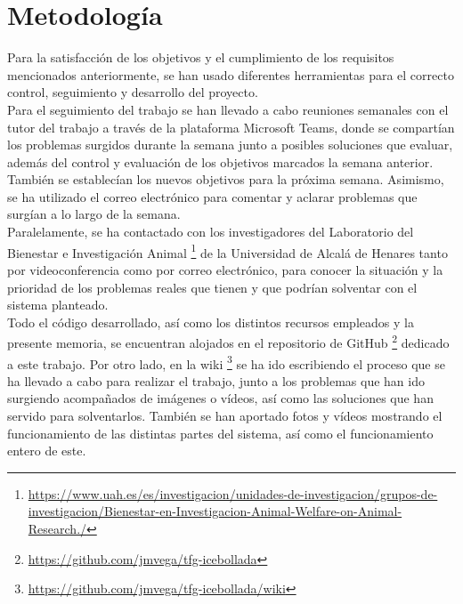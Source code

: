 \section{Metodología}
\label{sec:metodologia}
Para la satisfacción de los objetivos y el cumplimiento de los requisitos mencionados anteriormente, se han usado diferentes herramientas para el correcto control, seguimiento y desarrollo del proyecto.\\

Para el seguimiento del trabajo se han llevado a cabo reuniones semanales con el tutor del trabajo a través de la plataforma Microsoft Teams, donde se compartían los problemas surgidos durante la semana junto a posibles soluciones que evaluar, además del control y evaluación de los objetivos marcados la semana anterior. También se establecían los nuevos objetivos para la próxima semana. Asimismo, se ha utilizado el correo electrónico para comentar y aclarar problemas que surgían a lo largo de la semana.\\

Paralelamente, se ha contactado con los investigadores del Laboratorio del Bienestar e Investigación Animal \footnote{\url{https://www.uah.es/es/investigacion/unidades-de-investigacion/grupos-de-investigacion/Bienestar-en-Investigacion-Animal-Welfare-on-Animal-Research./}} de la Universidad de Alcalá de Henares tanto por videoconferencia como por correo electrónico, para conocer la situación y la prioridad de los problemas reales que tienen y que podrían solventar con el sistema planteado.\\

Todo el código desarrollado, así como los distintos recursos empleados y la presente memoria, se encuentran alojados en el repositorio de GitHub \footnote{\url{https://github.com/jmvega/tfg-icebollada}} dedicado a este trabajo. Por otro lado, en la wiki \footnote{\url{https://github.com/jmvega/tfg-icebollada/wiki}} se ha ido escribiendo el proceso que se ha llevado a cabo para realizar el trabajo, junto a los problemas que han ido surgiendo acompañados de imágenes o vídeos, así como las soluciones que han servido para solventarlos. También se han aportado fotos y vídeos mostrando el funcionamiento de las distintas partes del sistema, así como el funcionamiento entero de este.
